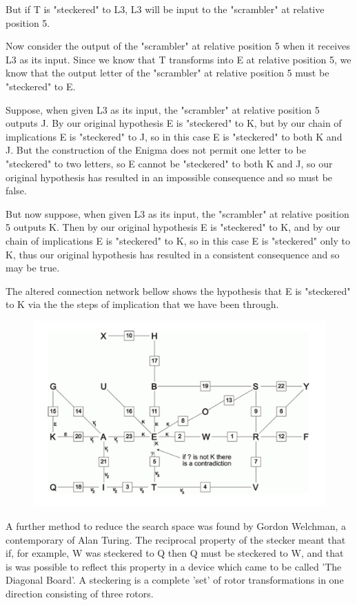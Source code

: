 \documentclass[12pt,a4paper]{article}
\begin{document}
But if T is "steckered" to L3, L3 will be input to the "scrambler" at relative position 5.

Now consider the output of the "scrambler" at relative position 5 when it receives L3 as its input. Since we know that T transforms into E at relative position 5, we know that the output letter of the "scrambler" at relative position 5 must be "steckered" to E.

Suppose, when given L3 as its input, the "scrambler" at relative position 5 outputs J. By our original hypothesis E is "steckered" to K, but by our chain of implications E is "steckered" to J, so in this case E is "steckered" to both K and J. But the construction of the Enigma does not permit one letter to be "steckered" to two letters, so E cannot be "steckered" to both K and J, so our original hypothesis has resulted in an impossible consequence and so must be false.

But now suppose, when given L3 as its input, the "scrambler" at relative position 5 outputs K. Then by our original hypothesis E is "steckered" to K, and by our chain of implications E is "steckered" to K, so in this case E is "steckered" only to K, thus our original hypothesis has resulted in a consistent consequence and so may be true.

The altered connection network bellow shows the hypothesis that E is "steckered" to K via the the steps of implication that we have been through.

\begin{figure}[h]
\centering
\includegraphics[width=\textwidth]{StageThreeBOMBE.png}
\end{figure}

A further method to reduce the search space was found by Gordon Welchman, a contemporary of Alan Turing. The reciprocal property of the stecker meant that if, for example, W was steckered to Q then Q must be steckered to W, and that is was possible to reflect this property in a device which came to be called 'The Diagonal Board'. A steckering is a complete 'set' of rotor transformations in one direction consisting of three rotors. 
\end{document}
